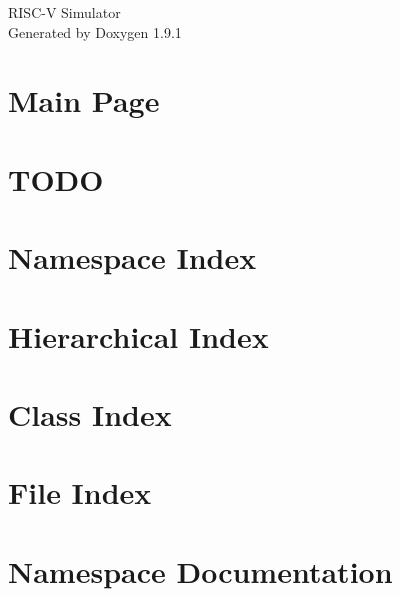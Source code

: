 \let\mypdfximage\pdfximage\def\pdfximage{\immediate\mypdfximage}\documentclass[twoside]{book}
\newcommand{\+}{\discretionary{\mbox{\scriptsize$\hookleftarrow$}}{}{}}
\newcommand{\clearemptydoublepage}{%
  \newpage{\pagestyle{empty}\cleardoublepage}%
}
\begin{document}
\raggedbottom

\hypersetup{pageanchor=false,
             bookmarksnumbered=true,
             pdfencoding=unicode
            }
\begin{titlepage}
\vspace*{7cm}
\begin{center}%
{\Large RISC-\/V Simulator }\\
\vspace*{1cm}
{\large Generated by Doxygen 1.9.1}\\
\end{center}
\end{titlepage}
\clearemptydoublepage
{}
\tableofcontents
\clearemptydoublepage
{}
\hypersetup{pageanchor=true}

\chapter{Main Page}
\label{index}\hypertarget{index}{}
\chapter{TODO}
\label{md_TODO}

\chapter{Namespace Index}

\chapter{Hierarchical Index}

\chapter{Class Index}

\chapter{File Index}

\chapter{Namespace Documentation}







\end{document}
